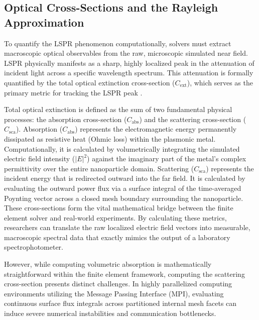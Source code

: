 \documentclass[class=report, crop=false]{standalone}
\begin{document}
\subsection{Optical Cross-Sections and the Rayleigh Approximation}

To quantify the LSPR phenomenon computationally, solvers must extract macroscopic optical observables from the raw, microscopic simulated near field. LSPR physically manifests as a sharp, highly localized peak in the attenuation of incident light across a specific wavelength spectrum. This attenuation is formally quantified by the total optical extinction cross-section ($C_{\text{ext}}$), which serves as the primary metric for tracking the LSPR peak \citep{Mayer2011}.

\vspace{12pt}

Total optical extinction is defined as the sum of two fundamental physical processes: the absorption cross-section ($C_{\text{abs}}$) and the scattering cross-section ($C_{\text{sca}}$). Absorption ($C_{\text{abs}}$) represents the electromagnetic energy permanently dissipated as resistive heat (Ohmic loss) within the plasmonic metal. Computationally, it is calculated by volumetrically integrating the simulated electric field intensity ($|E|^2$) against the imaginary part of the metal's complex permittivity over the entire nanoparticle domain. Scattering ($C_{\text{sca}}$) represents the incident energy that is redirected outward into the far field. It is calculated by evaluating the outward power flux via a surface integral of the time-averaged Poynting vector across a closed mesh boundary surrounding the nanoparticle. These cross-sections form the vital mathematical bridge between the finite element solver and real-world experiments. By calculating these metrics, researchers can translate the raw localized electric field vectors into measurable, macroscopic spectral data that exactly mimics the output of a laboratory spectrophotometer.

\vspace{12pt}

However, while computing volumetric absorption is mathematically straightforward within the finite element framework, computing the scattering cross-section presents distinct challenges. In highly parallelized computing environments utilizing the Message Passing Interface (MPI), evaluating continuous surface flux integrals across partitioned internal mesh facets can induce severe numerical instabilities and communication bottlenecks.
\end{document}
